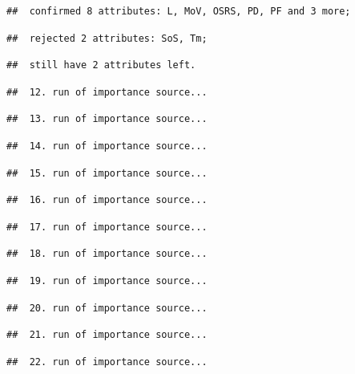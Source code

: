 \documentclass[
]{article}
\begin{document}
\begin{verbatim}
##  confirmed 8 attributes: L, MoV, OSRS, PD, PF and 3 more;
\end{verbatim}

\begin{verbatim}
##  rejected 2 attributes: SoS, Tm;
\end{verbatim}

\begin{verbatim}
##  still have 2 attributes left.
\end{verbatim}

\begin{verbatim}
##  12. run of importance source...
\end{verbatim}

\begin{verbatim}
##  13. run of importance source...
\end{verbatim}

\begin{verbatim}
##  14. run of importance source...
\end{verbatim}

\begin{verbatim}
##  15. run of importance source...
\end{verbatim}

\begin{verbatim}
##  16. run of importance source...
\end{verbatim}

\begin{verbatim}
##  17. run of importance source...
\end{verbatim}

\begin{verbatim}
##  18. run of importance source...
\end{verbatim}

\begin{verbatim}
##  19. run of importance source...
\end{verbatim}

\begin{verbatim}
##  20. run of importance source...
\end{verbatim}

\begin{verbatim}
##  21. run of importance source...
\end{verbatim}

\begin{verbatim}
##  22. run of importance source...
\end{verbatim}
\end{document}
